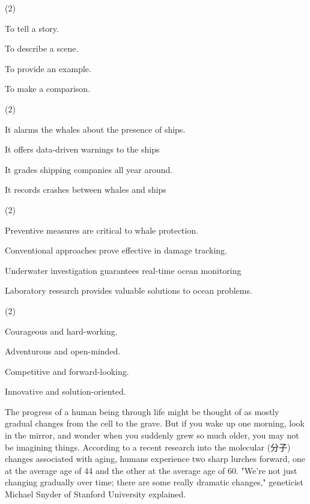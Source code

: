 \documentclass{英语试卷}
\begin{document}
\begin{choices}(2)
  \item To tell a story.
  \item To describe a scene.
  \item To provide an example.
  \item To make a comparison.
\end{choices}
\begin{choices}(2)
  \item It alarms the whales about the presence of ships.
  \item It offers data-driven warnings to the ships
  \item It grades shipping companies all year around.
  \item It records crashes between whales and ships
\end{choices}
\begin{choices}(2)
  \item Preventive measures are critical to whale protection.
  \item Conventional approaches prove effective in damage tracking.
  \item Underwater investigation guarantees real-time ocean monitoring
  \item Laboratory research provides valuable solutions to ocean problems.
\end{choices}
\begin{choices}(2)
  \item Courageous and hard-working.
  \item Adventurous and open-minded.
  \item Competitive and forward-looking.
  \item Innovative and solution-oriented.
\end{choices}
\par The progress of a human being through life might be thought of as mostly gradual changes from the cell to the grave. But if you wake up one morning, look in the mirror, and wonder when you suddenly grew so much older, you may not be imagining things. According to a recent research into the molecular (分子) changes associated with aging, humans experience two sharp lurches forward, one at the average age of 44 and the other at the average age of 60. "We’re not just changing gradually over time; there are some really dramatic changes," geneticist Michael Snyder of Stanford University explained.\par
\end{document}
